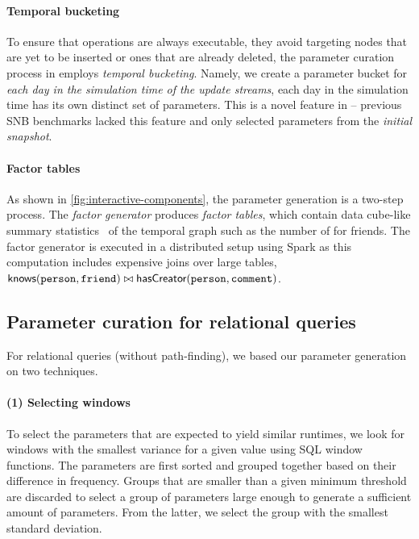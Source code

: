\paragraph{Temporal bucketing}
\label{sec:temporal-bucketing}
%
To ensure that operations are always executable, \ie they avoid targeting nodes that are yet to be inserted or ones that are already deleted, the parameter curation process in \interactivevtwo employs \emph{temporal bucketing}.
Namely, we create a parameter bucket for \emph{each day in the simulation time of the update streams},
\ie each day in the simulation time has its own distinct set of parameters.
This is a novel feature in \interactivevtwo{} -- previous SNB benchmarks lacked this feature and only selected parameters from the \emph{initial snapshot}.

\paragraph{Factor tables}
As shown in \autoref{fig:interactive-components}, the parameter generation is a two-step process.
The \emph{factor generator} produces \emph{factor tables}, which contain data cube-like summary statistics~\cite{DBLP:journals/datamine/GrayCBLRVPP97} of the temporal graph such as the number of \Messages for friends.
The factor generator is executed in a distributed setup using Spark as this computation includes expensive joins over large tables,
\eg $\textsf{knows}(\texttt{person}, \texttt{friend}) \bowtie \textsf{hasCreator}(\texttt{person}, \texttt{comment})$.


\subsection{Parameter curation for relational queries}

For relational queries (without path-finding), we based our parameter generation on two techniques.

\paragraph{(1) Selecting windows}
%
To select the parameters that are expected to yield similar runtimes, we look for windows with the smallest variance for a given value using SQL window functions.
The parameters are first sorted and grouped together based on their difference in frequency.
Groups that are smaller than a given minimum threshold are discarded to select a group of
parameters large enough to generate a sufficient amount of parameters.
From the latter, we select
the group with the smallest standard deviation.

